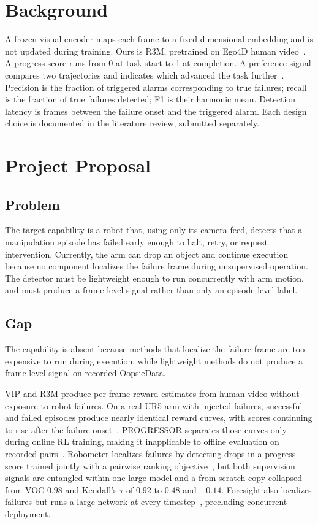 \documentclass{article}
\begin{document}
\section{Background}
A frozen visual encoder maps each frame to a fixed-dimensional embedding and is not updated during training. Ours is R3M, pretrained on Ego4D human video~\citep{r3m}. A progress score runs from 0 at task start to 1 at completion. A preference signal compares two trajectories and indicates which advanced the task further~\citep{robometer}. Precision is the fraction of triggered alarms corresponding to true failures; recall is the fraction of true failures detected; F1 is their harmonic mean. Detection latency is frames between the failure onset and the triggered alarm. Each design choice is documented in the literature review, submitted separately.

\section{Project Proposal}

\subsection{Problem}
The target capability is a robot that, using only its camera feed, detects that a manipulation episode has failed early enough to halt, retry, or request intervention. Currently, the arm can drop an object and continue execution because no component localizes the failure frame during unsupervised operation. The detector must be lightweight enough to run concurrently with arm motion, and must produce a frame-level signal rather than only an episode-level label.

\subsection{Gap}
The capability is absent because methods that localize the failure frame are too expensive to run during execution, while lightweight methods do not produce a frame-level signal on recorded OopsieData.

VIP and R3M produce per-frame reward estimates from human video without exposure to robot failures. On a real UR5 arm with injected failures, successful and failed episodes produce nearly identical reward curves, with scores continuing to rise after the failure onset~\citep{vip,r3m,progressor}. PROGRESSOR separates those curves only during online RL training, making it inapplicable to offline evaluation on recorded pairs~\citep{progressor}. Robometer localizes failures by detecting drops in a progress score trained jointly with a pairwise ranking objective~\citep{robometer}, but both supervision signals are entangled within one large model and a from-scratch copy collapsed from VOC $0.98$ and Kendall's $\tau$ of $0.92$ to $0.48$ and $-0.14$. Foresight also localizes failures but runs a large network at every timestep~\citep{foresight}, precluding concurrent deployment.
\end{document}
